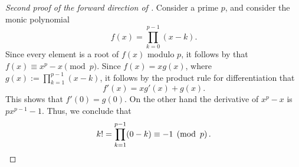 \begin{proof}[Second proof of the forward direction of ] Consider a prime $p$, and consider the monic polynomial \begin{equation*} f(x)=\prod_{k=0}^{p-1}(x-k). \end{equation*} Since every element is a root of $f(x)$ modulo $p$, it follows by  that $f(x)\equiv x^p-x\pmod{p}$. Since $f(x)=x g(x)$, where $g(x):=\prod_{k=1}^{p-1}(x-k)$, it follows by the product rule for differentiation that \begin{equation*} f'(x)=xg'(x)+g(x). \end{equation*} This shows that $f'(0)=g(0)$. On the other hand the derivative of $x^p-x$ is $p x^{p-1}-1$. Thus, we conclude that \begin{equation*} k!=\prod_{k=1}^{p-1}(0-k)\equiv -1\pmod{p}.\qedhere \end{equation*} \end{proof}



  
